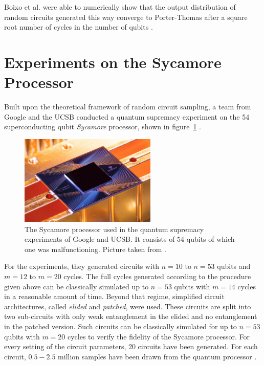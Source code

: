 Boixo et al. were able to numerically show that the output distribution of random circuits generated this way
converge to Porter-Thomas after a square root
number of cycles in the number of qubits \cite{Boixo2018supremacy}.

\section{Experiments on the Sycamore Processor}
\label{sec:experiments_sycamore}

Built upon the theoretical framework of random circuit sampling,
a team from Google and the UCSB conducted a quantum
supremacy experiment on the 54 superconducting qubit \textit{Sycamore}
processor, shown in figure~\ref{fig:sycamore} \cite{martines2019supremacy}.

\begin{figure}[H]
  \centering
  \includegraphics[width=0.58\textwidth]{figures/sycamore}
  \caption[The Sycamore Processor]{The Sycamore processor used in the quantum supremacy experiments of Google and UCSB. It consists of 54 qubits of which one was malfunctioning. Picture taken from \cite{martines2019supremacy}.}
  \label{fig:sycamore}
\end{figure}

For the experiments, they generated circuits with $n=10$ to $n=53$ qubits and
$m=12$ to $m=20$ cycles. The full cycles generated according to the procedure
given above can be classically simulated up to $n=53$ qubits with $m=14$ cycles
in a reasonable amount of time. Beyond that regime, simplified circuit
architectures, called \textit{elided} and \textit{patched}, were used. These circuits
are split into two sub-circuits with only weak entanglement in the elided and no
entanglement in the patched version. Such circuits can be classically simulated for up to $n=53$ qubits with $m=20$ cycles to
verify the fidelity of the Sycamore processor. For every setting of the circuit parameters, 20
circuits have been generated. For each circuit, $0.5-2.5$ million samples have been drawn
from the quantum processor \cite{martines2019supremacy}.

